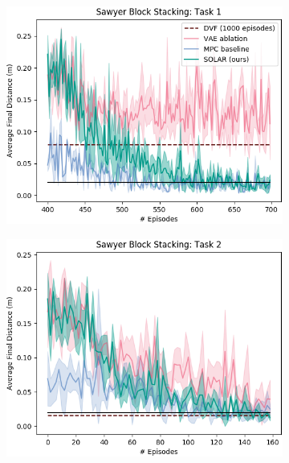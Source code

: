\begin{figure}
    \centering
    \begin{subfigure}{0.32\linewidth}
        \includegraphics[width=\linewidth]{img/solar/stacking-1.png}
        \caption{}
    \end{subfigure}
    \begin{subfigure}{0.32\linewidth}
        \includegraphics[width=\linewidth]{img/solar/stacking-2.png}
        \caption{}
    \end{subfigure}
    \begin{subfigure}{0.32\linewidth}

\end{subfigure}
\end{figure}
